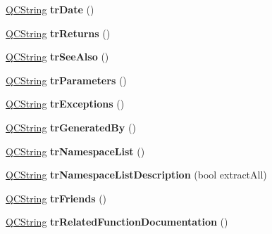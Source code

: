 \begin{DoxyCompactItemize}
\mbox{\hyperlink{class_q_c_string}{Q\+C\+String}} {\bfseries tr\+Date} ()
\item 
\mbox{\label{class_translator_croatian_a3e091ad02e26454f11da71486683e80e}} 
\mbox{\hyperlink{class_q_c_string}{Q\+C\+String}} {\bfseries tr\+Returns} ()
\item 
\mbox{\label{class_translator_croatian_a6b3f5448369b6df771eb6b4ace4cb563}} 
\mbox{\hyperlink{class_q_c_string}{Q\+C\+String}} {\bfseries tr\+See\+Also} ()
\item 
\mbox{\label{class_translator_croatian_a94220af13feb8ad40290de8ccdebbab8}} 
\mbox{\hyperlink{class_q_c_string}{Q\+C\+String}} {\bfseries tr\+Parameters} ()
\item 
\mbox{\label{class_translator_croatian_a4fea439896fcff5996180d18b51ae32c}} 
\mbox{\hyperlink{class_q_c_string}{Q\+C\+String}} {\bfseries tr\+Exceptions} ()
\item 
\mbox{\label{class_translator_croatian_ae878281bdefd1503fe03a65ab1f65c3e}} 
\mbox{\hyperlink{class_q_c_string}{Q\+C\+String}} {\bfseries tr\+Generated\+By} ()
\item 
\mbox{\label{class_translator_croatian_a95224cf59498abd0876a5b1197ac68f8}} 
\mbox{\hyperlink{class_q_c_string}{Q\+C\+String}} {\bfseries tr\+Namespace\+List} ()
\item 
\mbox{\label{class_translator_croatian_ace23332dedd9c5eff8cbcf5c0900b50a}} 
\mbox{\hyperlink{class_q_c_string}{Q\+C\+String}} {\bfseries tr\+Namespace\+List\+Description} (bool extract\+All)
\item 
\mbox{\label{class_translator_croatian_a0813b171fab34d20f8ba51ac05b71d32}} 
\mbox{\hyperlink{class_q_c_string}{Q\+C\+String}} {\bfseries tr\+Friends} ()
\item 
\mbox{\label{class_translator_croatian_a17099996311c6f1e67a5f0c843426901}} 
\mbox{\hyperlink{class_q_c_string}{Q\+C\+String}} {\bfseries tr\+Related\+Function\+Documentation} ()

\end{DoxyCompactItemize}
